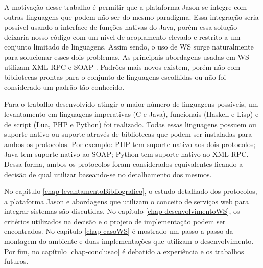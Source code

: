 A motivação desse trabalho é permitir que a plataforma Jason se integre com
outras linguagens que podem não ser do mesmo paradigma. Essa integração seria
possível usando a interface de funções nativas do Java, porém essa solução
deixaria nosso código com um nível de acoplamento elevado e restrito a um
conjunto limitado de linguagens.
Assim sendo, o uso de WS surge naturalmente para solucionar esses dois
problemas. As principais abordagens usadas em WS utilizam XML-RPC e SOAP
\cite{cerami2002web}. Padrões mais novos existem, porém não com bibliotecas
prontas para o conjunto de linguagens escolhidas ou não foi considerado um
padrão tão conhecido.

Para o trabalho
desenvolvido atingir o maior número de linguagens possíveis, um levantamento em
linguagens imperativas (C e Java), funcionais (Haskell e Lisp) e de script
(Lua, PHP e Python) foi realizado. Todas essas linguagens possuem ou suporte
nativo ou suporte através de bibliotecas que podem ser instaladas para ambos
os protocolos. Por exemplo: PHP tem suporte nativo aos dois protocolos; Java
tem suporte nativo ao SOAP; Python tem suporte nativo ao XML-RPC. Dessa forma,
ambos os protocolos foram considerados equivalentes ficando a decisão de qual
utilizar baseando-se no detalhamento dos mesmos.

No capítulo \ref{chap-levantamentoBibliografico},
o estudo detalhado dos protocolos, a plataforma Jason e abordagens que
utilizam o conceito de serviços web para integrar sistemas são discutidas.
No capítulo \ref{chap-desenvolvimentoWS}, os critérios utilizados na decisão e
o projeto de implementação podem ser encontrados. No capítulo \ref{chap-casoWS}
é mostrado um passo-a-passo da montagem do ambiente e duas implementações que
utilizam o desenvolvimento. Por fim, no capítulo \ref{chap-conclusao} é
debatido a experiência e os trabalhos futuros.



